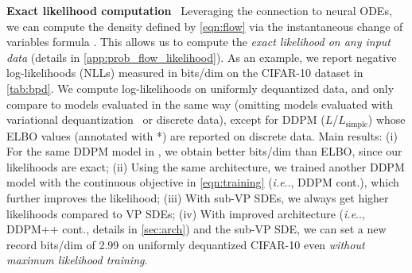 \documentclass{article} %
\makeatletter
\def\@onedot{\ifx\@let@token.\else.\null\fi\xspace}
\DeclareRobustCommand\onedot{\futurelet\@let@token\@onedot}
\def\ie{\emph{i.e}\onedot}
\makeatother
\begin{document}
\textbf{Exact likelihood computation}~ Leveraging the connection to neural ODEs, we can compute the density defined by \cref{eqn:flow}  via the instantaneous change of variables formula \citep{chen2018neural}. This allows us to compute the \emph{exact likelihood on any input data} (details in \cref{app:prob_flow_likelihood}). %
As an example, we report negative log-likelihoods (NLLs) measured in bits/dim on the CIFAR-10 dataset in \cref{tab:bpd}. We compute log-likelihoods on uniformly dequantized data, and only compare to models evaluated in the same way (omitting models evaluated with variational dequantization~\citep{ho2019flow++} or discrete data), except for DDPM ($L$/$L_\text{simple}$) whose ELBO values (annotated with *) are reported on discrete data. Main results: (i) For the same DDPM model in \citet{ho2020denoising}, we obtain better bits/dim than ELBO, since our likelihoods are exact; (ii) Using the same architecture, we trained another DDPM model with the continuous objective in \cref{eqn:training} (\ie, DDPM cont.), which further improves the likelihood; (iii) With sub-VP SDEs, we always get higher likelihoods compared to VP SDEs; (iv) With improved architecture (\ie, DDPM++ cont., details in \cref{sec:arch}) and the sub-VP SDE, we can set a new record bits/dim of 2.99 on uniformly dequantized CIFAR-10 even \emph{without maximum likelihood training}.
\end{document}
